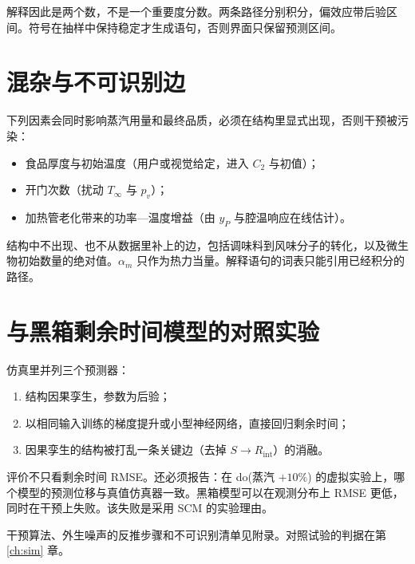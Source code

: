 解释因此是两个数，不是一个重要度分数。两条路径分别积分，偏效应带后验区间。符号在抽样中保持稳定才生成语句，否则界面只保留预测区间。

\section{混杂与不可识别边}

下列因素会同时影响蒸汽用量和最终品质，必须在结构里显式出现，否则干预被污染：

\begin{itemize}
\item 食品厚度与初始温度（用户或视觉给定，进入 $C_2$ 与初值）；
\item 开门次数（扰动 $T_\infty$ 与 $p_v$）；
\item 加热管老化带来的功率—温度增益（由 $y_P$ 与腔温响应在线估计）。
\end{itemize}

结构中不出现、也不从数据里补上的边，包括调味料到风味分子的转化，以及微生物初始数量的绝对值。$\alpha_m$ 只作为热力当量。解释语句的词表只能引用已经积分的路径。

\section{与黑箱剩余时间模型的对照实验}

仿真里并列三个预测器：

\begin{enumerate}
\item 结构因果孪生，参数为后验；
\item 以相同输入训练的梯度提升或小型神经网络，直接回归剩余时间；
\item 因果孪生的结构被打乱一条关键边（去掉 $S\to R_{\mathrm{int}}$）的消融。
\end{enumerate}

评价不只看剩余时间 RMSE。还必须报告：在 do(蒸汽 $+10\%$) 的虚拟实验上，哪个模型的预测位移与真值仿真器一致。黑箱模型可以在观测分布上 RMSE 更低，同时在干预上失败。该失败是采用 SCM 的实验理由。

干预算法、外生噪声的反推步骤和不可识别清单见附录。对照试验的判据在第 \ref{ch:sim} 章。

